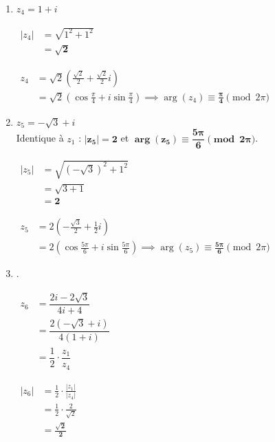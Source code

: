 \documentclass[12pt,a4paper]{article}
\begin{document}
\begin{enumerate}
    \item $z_4 = 1 + i$
    
    $
    \begin{aligned}
        |z_4| &= \sqrt{1^2 + 1^2}\\
        &= \mathbf{\sqrt{2}}
    \end{aligned}
    $
    
    $
    \begin{aligned}
        z_4 &= \sqrt{2}\left(\frac{\sqrt{2}}{2} + \frac{\sqrt{2}}{2}i\right)\\
        &= \sqrt{2}\left(\cos\frac{\pi}{4} + i\sin\frac{\pi}{4}\right) \implies \arg(z_4) \equiv \mathbf{\frac{\pi}{4}} \pmod{2\pi}
    \end{aligned}
    $
    
    \item $z_5 = -\sqrt{3} + i$ \\
    Identique à $z_1$ : $\mathbf{|z_5| = 2}$ et $\mathbf{\arg(z_5) \equiv \dfrac{5\pi}{6} \pmod{2\pi}}$.

	$
    \begin{aligned}
        |z_5| &= \sqrt{(-\sqrt{3})^2 + 1^2}\\
        &= \sqrt{3 + 1}\\
        &= \mathbf{2}
    \end{aligned}
    $
    
    $
    \begin{aligned}
        z_5 &= 2\left(-\frac{\sqrt{3}}{2} + \frac{1}{2}i\right)\\
        &= 2\left(\cos\frac{5\pi}{6} + i\sin\frac{5\pi}{6}\right) \implies \arg(z_5) \equiv \mathbf{\frac{5\pi}{6}} \pmod{2\pi}
    \end{aligned}
    $

    \item .
    
	$
    \begin{aligned}
    z_6 &= \dfrac{2i - 2\sqrt{3}}{4i + 4}\\ 
    &= \dfrac{2(-\sqrt{3} + i)}{4(1 + i)}\\ 
    &= \dfrac{1}{2} \cdot \dfrac{z_1}{z_4}
        \end{aligned}
    $
    
    $
    \begin{aligned}
        |z_6| &= \frac{1}{2} \cdot \frac{|z_1|}{|z_4|}\\
        &= \frac{1}{2} \cdot \frac{2}{\sqrt{2}}\\
        &= \mathbf{\frac{\sqrt{2}}{2}}
    \end{aligned}
    $
    

\end{enumerate}
\end{document}
